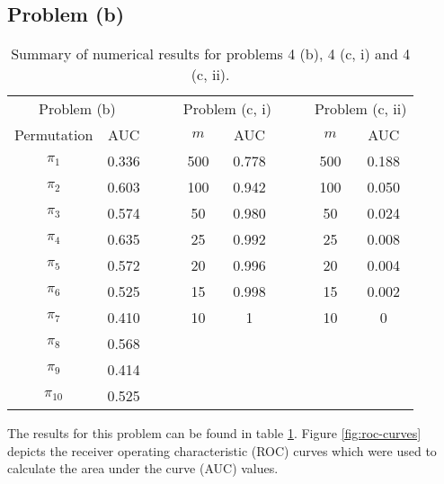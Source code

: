 \subsection*{Problem (b)}

\begin{table}
\centering{}\caption{Summary of numerical results for problems 4 (b), 4 (c, i) and 4 (c,
ii).\label{tab:result-table}}
\begin{tabular}{cccccccc}
\toprule 
\multicolumn{2}{c}{Problem (b)} & $\quad$ & \multicolumn{2}{c}{Problem (c, i)} & $\quad$ & \multicolumn{2}{c}{Problem (c, ii)}\tabularnewline
\cmidrule{1-2} \cmidrule{4-5} \cmidrule{7-8} 
Permutation & AUC &  & $m$ & AUC &  & $m$ & AUC\tabularnewline
\cmidrule{1-2} \cmidrule{4-5} \cmidrule{7-8} 
$\pi_{1}$ & 0.336 &  & 500 & 0.778 &  & 500 & 0.188\tabularnewline
$\pi_{2}$ & 0.603 &  & 100 & 0.942 &  & 100 & 0.050\tabularnewline
$\pi_{3}$ & 0.574 &  & 50 & 0.980 &  & 50 & 0.024\tabularnewline
$\pi_{4}$ & 0.635 &  & 25 & 0.992 &  & 25 & 0.008\tabularnewline
$\pi_{5}$ & 0.572 &  & 20 & 0.996 &  & 20 & 0.004\tabularnewline
$\pi_{6}$ & 0.525 &  & 15 & 0.998 &  & 15 & 0.002\tabularnewline
$\pi_{7}$ & 0.410 &  & 10 & 1 &  & 10 & 0\tabularnewline
$\pi_{8}$ & 0.568 &  &  &  &  &  & \tabularnewline
$\pi_{9}$ & 0.414 &  &  &  &  &  & \tabularnewline
$\pi_{10}$ & 0.525 &  &  &  &  &  & \tabularnewline
\bottomrule
\end{tabular}
\end{table}


The results for this problem can be found in table \ref{tab:result-table}.
Figure \ref{fig:roc-curves} depicts the receiver operating characteristic
(ROC) curves which were used to calculate the area under the curve
(AUC) values.

